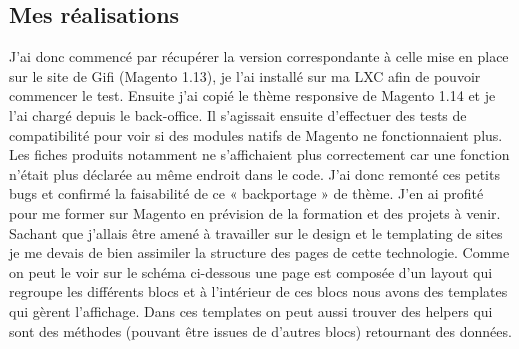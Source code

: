 \documentclass[a4paper,11pt,twoside]{report}
\begin{document}
    \subsection*{Mes réalisations}
    J'ai donc commencé par récupérer la version correspondante à celle mise en place sur le site de Gifi (Magento 1.13), je l'ai installé sur ma LXC afin de pouvoir commencer le test. Ensuite j'ai copié le thème responsive de Magento 1.14 et je l'ai chargé depuis le back-office. Il s'agissait ensuite d'effectuer des tests de compatibilité pour voir si des modules natifs de Magento ne fonctionnaient plus. Les fiches produits notamment ne s'affichaient plus correctement car une fonction n'était plus déclarée au même endroit dans le code. J'ai donc remonté ces petits bugs et confirmé la faisabilité de ce « backportage » de thème. J'en ai profité pour me former sur Magento en prévision de la formation et des projets à venir. Sachant que j'allais être amené à travailler sur le design et le templating de sites je me devais de bien assimiler la structure des pages de cette technologie. Comme on peut le voir sur le schéma ci-dessous une page est composée d'un layout qui regroupe les différents blocs et à l'intérieur de ces blocs nous avons des templates qui gèrent l'affichage. Dans ces templates on peut aussi trouver des helpers qui sont des méthodes (pouvant être issues de d'autres blocs) retournant des données.
    
\end{document}

